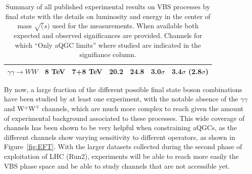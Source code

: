 \begin{table}[htb]
\begin{tabular}{|l|c|c|c|c|c|c|}
    $\gamma\gamma\rightarrow WW$ & 8 TeV                 & 7+8 TeV & 20.2  & 24.8 & 3.0$\sigma$ \cite{Aaboud:2016dkv}                                 & 3.4$\sigma$ (2.8$\sigma$) \cite{Khachatryan:2016mud} \\
    \hline
  \end{tabular}
\caption{\label{tab:wg2:expres} Summary of all published experimental results on VBS processes by final state with the details on luminosity and energy in the center of mass $\sqrt(s)$ used for the measurements. When available both expected and observed significances are provided. Channels for which ``Only aQGC limits'' where studied are indicated in the signifiance column.}
\end{table}

By now, a large fraction of the different possible final state boson combinations have been studied by at least one experiment, with the notable absence of the $\gamma\gamma$ and W$^\pm$W$^\mp$ channels, which are much more complex to reach given the amount of experimental background associated to these processes. This wide coverage of channels has been shown to be very helpful when constraining aQGCs, as the different channels show varying sensitivity to different operators, as shown in Figure~\ref{fig:EFT}.
With the larger datasets collected during the second phase of exploitation of LHC (Run2), experiments will be able to reach more easily the VBS phase space and be able to study channels that are not accessible yet.

